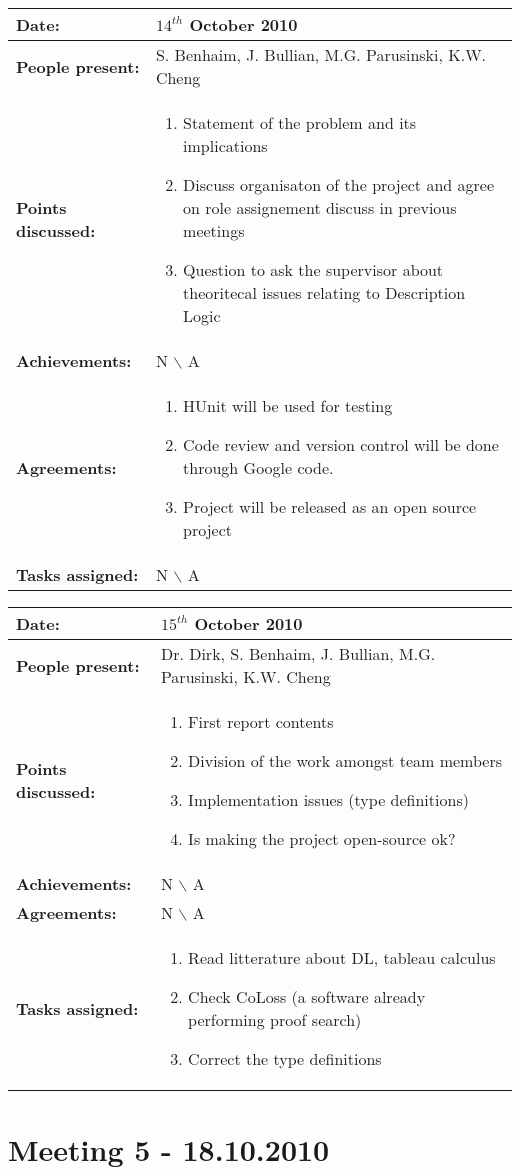 \documentclass[12pt,a4paper]{article}
\newcommand{\meeting}[6]{%
\begin{center}%
\begin{longtable}{| p{3.5cm}  | p{13cm} |}%
\hline%
\textbf{Date:} & #1 \\%
\hline%
\textbf{People present:} &#2 \\%
\hline%
\textbf{Points discussed:} &#3\\%
\hline%
\textbf{Achievements:} &#4 \\%
\hline%
\textbf{Agreements:} &#5 \\%
\hline%
\textbf{Tasks assigned:} &#6  \\%
\hline%
\end{longtable}%
\end{center}%
\bigbreak
}
\begin{document}
\meeting{$14^{th}$ October 2010}%
{S. Benhaim, J. Bullian, M.G. Parusinski, K.W. Cheng}%
{ \begin{enumerate} \item Statement of the problem and its implications 
 \item Discuss organisaton of the project and agree on role assignement discuss in 
previous meetings
\item Question to ask the supervisor about theoritecal issues relating to Description Logic
\end{enumerate} }%
{ N $\backslash$ A}%
{ \begin{enumerate}
\item HUnit will be used for testing
\item Code review and version control will be done through Google code. 
\item Project will be released as an open source project
\end{enumerate}}%
{N $\backslash$ A}

\meeting{$15^{th}$ October 2010}%
{Dr. Dirk, S. Benhaim, J. Bullian, M.G. Parusinski, K.W. Cheng}%
{ \begin{enumerate} \item First report contents
\item Division of the work amongst team members
\item Implementation issues (type definitions)
\item Is making the project open-source ok?
\end{enumerate} }%
{ N $\backslash$ A}%
{N $\backslash$ A}
{ \begin{enumerate}
\item Read litterature about DL, tableau calculus
\item Check CoLoss (a software already performing proof search)
\item Correct the type definitions 
\end{enumerate}}%

\section*{Meeting 5 - 18.10.2010}
\end{document}
